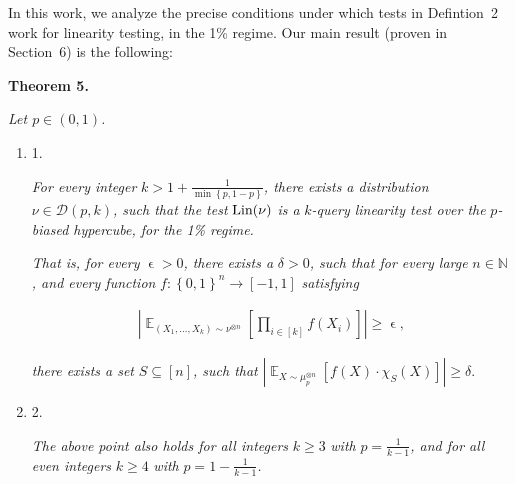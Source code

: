\documentclass[10pt,a4paper]{article}
\begin{document}



In this work, we analyze the precise conditions under which tests in Defintion 2 work for linearity testing, in the 1\% regime.
Our main result (proven in Section 6) is the following:\par






\par\medskip\noindent\textbf{
\textbf{Theorem 5}\textbf{.}
}\par



\emph{Let $p\in(0,1)$.}\par


\begin{enumerate}


\item[] 
1. 


\emph{For every integer }$k>1+\frac{1}{\min\left\{p,1-p\right\}}$\emph{, there exists a distribution }$\nu\in\mathcal{D}(p,k)$\emph{, such that the test }$\textnormal{Lin}(\nu)$\emph{ is a }$k$\emph{-query linearity test over the }$p$\emph{-biased hypercube, for the 1\% regime.}\par




\emph{That is, for every }$\mathop{\epsilon}>0$\emph{, there exists a }$\delta>0$\emph{, such that for every large }$n\in\mathbb{N}$\emph{, and every function }$f:\left\{0,1\right\}^{n}\to[-1,1]$\emph{ satisfying}\par


\[\begin{gathered}
\left|\mathop{\mathbb{E}}_{(X_{1},\dots,X_{k})\sim\nu^{\otimes n}}\left[\prod_{i\in[k]}f(X_{i})\right]\right|\geqslant\mathop{\epsilon},
\end{gathered}\]


\emph{there exists a set }$S\subseteq[n]$\emph{, such that }$\left|\mathop{\mathbb{E}}_{X\sim\mu_{p}^{\otimes n}}\left[f(X)\cdot\chi_{S}(X)\right]\right|\geqslant\delta.$\emph{}\par





\item[] 
2. 


\emph{The above point also holds for all integers }$k\geqslant 3$\emph{ with }$p=\frac{1}{k-1}$\emph{, and for all even integers }$k\geqslant 4$\emph{ with }$p=1-\frac{1}{k-1}$\emph{.}\par






\end{enumerate}
\end{document}
